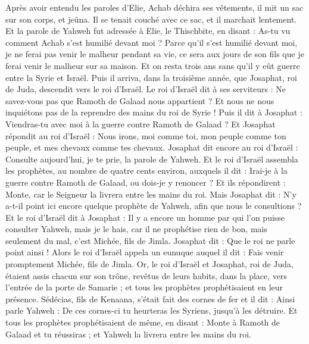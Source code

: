 \begin{multicols}{2}
Après avoir entendu les paroles d’Elie, Achab déchira ses vêtements, il mit un sac sur son corps, et jeûna. Il se tenait couché avec ce sac, et il marchait lentement.
Et la parole de Yahweh fut adressée à Elie, le Thischbite, en disant :
As-tu vu comment Achab s'est humilié devant moi ? Parce qu'il s'est humilié devant moi, je ne ferai pas venir le malheur pendant sa vie, ce sera aux jours de son fils que je ferai venir le malheur sur sa maison.
\VerseOne{}Et on resta trois ans sans qu'il y eût guerre entre la Syrie et Israël.
Puis il arriva, dans la troisième année, que Josaphat, roi de Juda, descendit vers le roi d'Israël.
Le roi d'Israël dit à ses serviteurs : Ne savez-vous pas que Ramoth de Galaad nous appartient ? Et nous ne nous inquiétons pas de la reprendre des mains du roi de Syrie !
Puis il dit à Josaphat : Viendras-tu avec moi à la guerre contre Ramoth de Galaad ? Et Josaphat répondit au roi d'Israël : Nous irons, moi comme toi, mon peuple comme ton peuple, et mes chevaux comme tes chevaux.
Josaphat dit encore au roi d'Israël : Consulte aujourd'hui, je te prie, la parole de Yahweh.
Et le roi d'Israël assembla les prophètes, au nombre de quatre cents environ, auxquels il dit : Irai-je à la guerre contre Ramoth de Galaad, ou dois-je y renoncer ? Et ils répondirent : Monte, car le Seigneur la livrera entre les mains du roi.
Mais Josaphat dit : N'y a-t-il point ici encore quelque prophète de Yahweh, afin que nous le consultions ?
Et le roi d'Israël dit à Josaphat : Il y a encore un homme par qui l’on puisse consulter Yahweh, mais je le hais, car il ne prophétise rien de bon, mais seulement du mal, c'est Michée, fils de Jimla. Josaphat dit : Que le roi ne parle point ainsi !
Alors le roi d'Israël appela un eunuque auquel il dit : Fais venir promptement Michée, fils de Jimla.
Or, le roi d'Israël et Josaphat, roi de Juda, étaient assis chacun sur son trône, revêtus de leurs habits, dans la place, vers l'entrée de la porte de Samarie ; et tous les prophètes prophétisaient en leur présence.
Sédécias, fils de Kenaana, s'était fait des cornes de fer et il dit : Ainsi parle Yahweh : De ces cornes-ci tu heurteras les Syriens, jusqu'à les détruire.
Et tous les prophètes prophétisaient de même, en disant : Monte à Ramoth de Galaad et tu réussiras ; et Yahweh la livrera entre les mains du roi.
\end{multicols}

